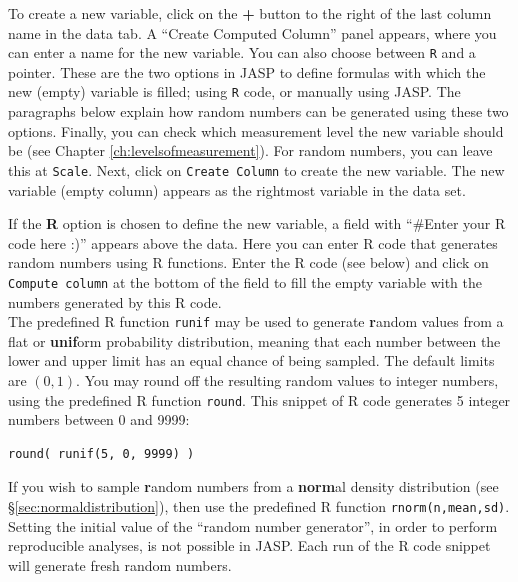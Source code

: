 \documentclass[
]{book}
\begin{document}
To create a new variable, click on the \textbf{+} button to the right of the last column name in the data tab. A ``Create Computed Column'' panel appears, where you can enter a name for the new variable. You can also choose between \texttt{R} and a pointer. These are the two options in JASP to define formulas with which the new (empty) variable is filled; using \texttt{R} code, or manually using JASP. The paragraphs below explain how random numbers can be generated using these two options. Finally, you can check which measurement level the new variable should be (see Chapter \ref{ch:levelsofmeasurement}). For random numbers, you can leave this at \texttt{Scale}. Next, click on \texttt{Create\ Column} to create the new variable. The new variable (empty column) appears as the rightmost variable in the data set.

If the \textbf{R} option is chosen to define the new variable, a field with ``\#Enter your R code here :)'' appears above the data. Here you can enter R code that generates random numbers using R functions. Enter the R code (see below) and click on \texttt{Compute\ column} at the bottom of the field to fill the empty variable with the numbers generated by this R code.\\
The predefined R function \texttt{runif} may be used to generate \textbf{r}andom values from a flat or \textbf{unif}orm probability distribution, meaning that each number between the lower and upper limit has an equal chance of being sampled. The default limits are \((0,1)\). You may round off the resulting random values to integer numbers, using the predefined R function \texttt{round}.
This snippet of R code generates 5 integer numbers between 0 and 9999:

\begin{verbatim}
round( runif(5, 0, 9999) )
\end{verbatim}

If you wish to sample \textbf{r}andom numbers from a \textbf{norm}al density distribution (see §\ref{sec:normaldistribution}), then use the predefined R function \texttt{rnorm(n,mean,sd)}.\\
Setting the initial value of the ``random number generator'', in order to perform reproducible analyses, is not possible in JASP. Each run of the R code snippet will generate fresh random numbers.
\end{document}
